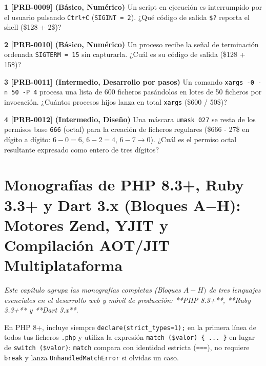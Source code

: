 \documentclass{book}
\begin{document}
\begin{tcolorbox}[title={Ejercicios}, studiumworked, breakable]

\noindent\textbf{1 [PRB-0009] (Básico, Numérico)}
Un script en ejecución es interrumpido por el usuario pulsando \texttt{Ctrl+C} (\texttt{SIGINT = 2}). ¿Qué código de salida \texttt{\$?} reporta el shell (\$128 + 2\$)?

\noindent\textbf{2 [PRB-0010] (Básico, Numérico)}
Un proceso recibe la señal de terminación ordenada \texttt{SIGTERM = 15} sin capturarla. ¿Cuál es su código de salida (\$128 + 15\$)?

\noindent\textbf{3 [PRB-0011] (Intermedio, Desarrollo por pasos)}
Un comando \texttt{xargs -0 -n 50 -P 4} procesa una lista de 600 ficheros pasándolos en lotes de 50 ficheros por invocación. ¿Cuántos procesos hijos lanza en total \texttt{xargs} (\$600 / 50\$)?

\noindent\textbf{4 [PRB-0012] (Intermedio, Diseño)}
Una máscara \texttt{umask 027} se resta de los permisos base \texttt{666} (octal) para la creación de ficheros regulares (\$666 - 27\$ en dígito a dígito: \(6-0=6\), \(6-2=4\), \(6-7\to 0\)). ¿Cuál es el permiso octal resultante expresado como entero de tres dígitos?
\end{tcolorbox}

\chapter{Monografías de PHP 8.3+, Ruby 3.3+ y Dart 3.x (Bloques A\(-\)H): Motores Zend, YJIT y Compilación AOT/JIT Multiplataforma}
\label{chap:cap03-monografias-php-ruby-dart-web-movil}

\noindent\textit{Este capítulo agrupa las monografías completas (Bloques \(A-H)\) de tres lenguajes esenciales en el desarrollo web y móvil de producción: **PHP 8.3+**, **Ruby 3.3+** y **Dart 3.x**.}

\begin{tcolorbox}[title={Consejo}, studiumtip, breakable]

En PHP 8+, incluye siempre \texttt{declare(strict\_types=1);} en la primera línea de todos tus ficheros \texttt{.php} y utiliza la expresión \texttt{match (\$valor) \{ ... \}} en lugar de \texttt{switch (\$valor)}: \texttt{match} compara con identidad estricta (\texttt{===}), no requiere \texttt{break} y lanza \texttt{UnhandledMatchError} si olvidas un caso.
\end{tcolorbox}
\end{document}
